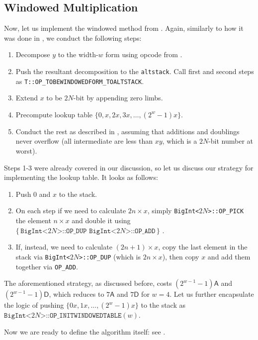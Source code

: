 \documentclass{iacrtrans}
\newcommand{\opcode}[1]{\, \texttt{#1} \,}
\newcommand{\script}[1]{ $\big\{ #1 \big\}$ }
\begin{document}
\subsection{Windowed Multiplication}

Now, let us implement the windowed method from . Again, similarly to how it was done in , we conduct the following steps: 
\begin{enumerate}
    \item Decompose $y$ to the width-$w$ form using opcode from .
    \item Push the resultant decomposition to the \texttt{altstack}. Call first and second steps as \texttt{T::OP\_TOBEWINDOWEDFORM\_TOALTSTACK}.
    \item Extend $x$ to be $2N$-bit by appending zero limbs.
    \item Precompute lookup table $\{0,x,2x,3x,\dots,(2^w-1)x\}$.
    \item Conduct the rest as described in , assuming that additions and doublings never overflow (all intermediate are less than $xy$, which is a $2N$-bit number at worst).
\end{enumerate}

Steps 1-3 were already covered in our discussion, so let us discuss our strategy for implementing the lookup table. It looks as follows:
\begin{enumerate}
    \item Push $0$ and $x$ to the stack.
    \item On each step if we need to calculate $2n \times x$, simply \texttt{BigInt<$2N$>::OP\_PICK} the element $n \times x$ and double it using \script{\opcode{BigInt<$2N$>::OP\_DUP} \opcode{BigInt<$2N$>::OP\_ADD}}.
    \item If, instead, we need to calculate $(2n+1) \times x$, copy the last element in the stack via \texttt{BigInt<$2N$>::OP\_DUP} (which is $2n \times x$), then copy $x$ and add them together via \texttt{OP\_ADD}.
\end{enumerate}

The aforementioned strategy, as discussed before, costs $(2^{w-1}-1)\mathsf{A}$ and $(2^{w-1}-1)\mathsf{D}$, which reduces to $7\mathsf{A}$ and $7\mathsf{D}$ for $w=4$. Let us further encapsulate the logic of pushing $\{0x,1x,\dots,(2^w-1)x\}$ to the stack as $\texttt{BigInt<$2N$>::OP\_INITWINDOWEDTABLE}(w)$.

Now we are ready to define the algorithm itself: see .
\end{document}
